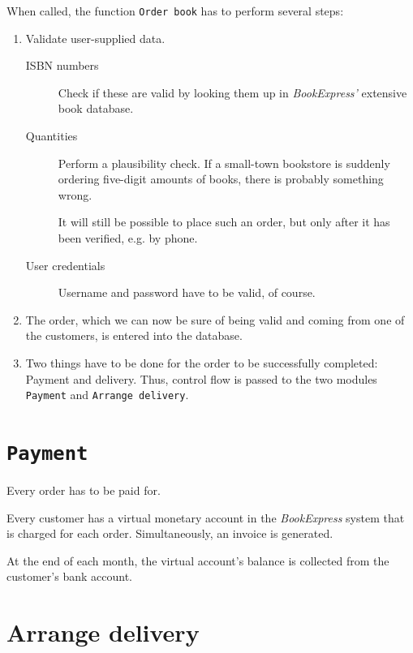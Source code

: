 When called, the function \texttt{Order book} has to perform several steps:
\begin{enumerate}
	\item Validate user-supplied data.

		  \begin{description}
		  	\item[ISBN numbers] Check if these are valid by looking them up in \emph{BookExpress'} extensive book database.
			\item[Quantities]   Perform a plausibility check. If a small-town bookstore is suddenly ordering five-digit amounts of books,
			                    there is probably something wrong.

								It will still be possible to place such an order, but only after it has been verified, e.g. by phone.
			\item[User credentials] Username and password have to be valid, of course.
		  \end{description}
   \item The order, which we can now be sure of being valid and coming from one of the customers, is entered into the database.
   \item Two things have to be done for the order to be successfully completed: Payment and delivery. Thus, control flow is passed to the
         two modules \texttt{Payment} and \texttt{Arrange delivery}.
\end{enumerate}

\section{\texttt{Payment}}
Every order has to be paid for.

Every customer has a virtual monetary account in the \emph{BookExpress} system that is charged for each order. Simultaneously, an invoice
is generated.

At the end of each month, the virtual account's balance is collected from the customer's bank account.

\section{Arrange delivery}






















